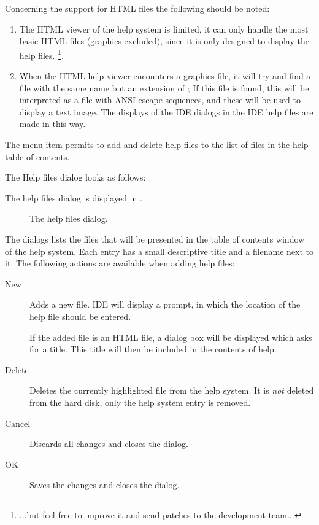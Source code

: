 \begin{remark}
Concerning the support for HTML files the following should be noted:
\begin{enumerate}
\item
The HTML viewer of the  help system is limited, it can only handle the 
most basic HTML files (graphics excluded), since it is only designed 
to display the \fpc help files. \footnote{...but feel free to improve it and send patches to the 
\fpc development team...}.
\item
When the HTML help viewer encounters a graphics file, it will try and find a
file with the same name but an extension of ; If this file is
found, this will be interpreted as a file with ANSI escape sequences, and 
these will be used to display a text image. The displays of the IDE dialogs
in the IDE help files are made in this way.
\end{enumerate}
\end{remark}

The menu item  permits to add and delete help files to the
list of files in the help table of contents.
\begin{htmlonly}
The Help files dialog looks as follows:
\end{htmlonly}
\begin{latexonly}
The help files dialog is displayed in .
\begin{figure}[ht]
\begin{center}
\caption{The help files dialog.}\label{fig:helpfiles}
\ifpdf
{}
\else
{}
\fi
\end{center}
\end{figure}
\end{latexonly}
The dialogs lists the files that will be presented in the table of contents
window of the help system. Each entry has a small descriptive title and a
filename next to it. The following actions are available when adding help
files:
\begin{description}
\item[New] Adds a new file. IDE will display a prompt, in which the 
location of the help file should be entered. 

If the added file is an HTML file, a dialog box will be displayed
which asks for a title. This title will then be included in the
contents of help.
\item[Delete] Deletes the currently highlighted file from the help system.
It is \emph{not} deleted from the hard disk, only the help system entry is
removed.
\item[Cancel] Discards all changes and closes the dialog.
\item[OK] Saves the changes and closes the dialog.
\end{description}

